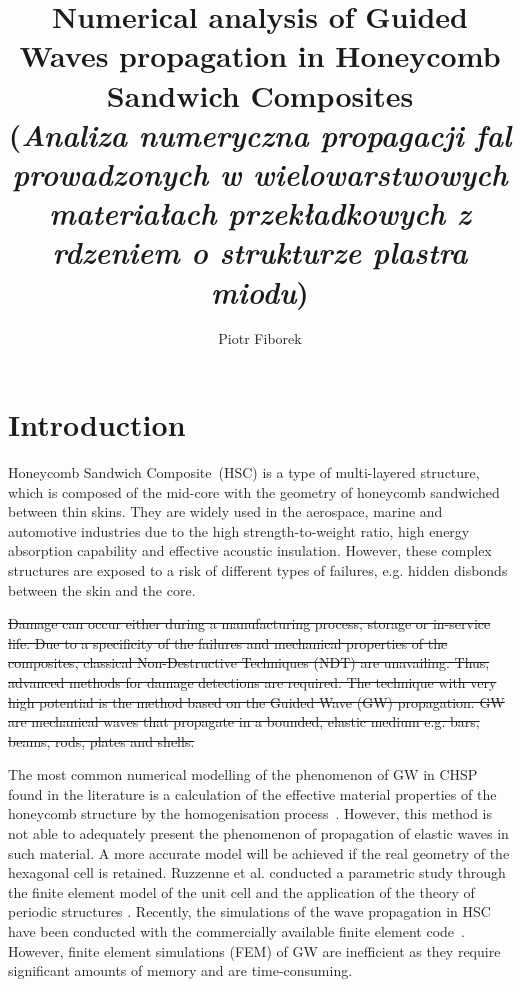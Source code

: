 \documentclass[a4paper,12pt]{article}
\author{Piotr Fiborek}
\title{Numerical analysis of Guided Waves propagation in Honeycomb Sandwich Composites\\
(\textit{Analiza numeryczna propagacji fal prowadzonych w wielowarstwowych materia\l{}ach przek\l{}adkowych z rdzeniem o strukturze plastra miodu})}
\providecommand{\DIFdel}[1]{{\protect\color{red}\sout{#1}}}                      %
\providecommand{\DIFdelbegin}{} %
\providecommand{\DIFdelend}{} %
\newcommand{\DIFscaledelfig}{0.5}
\newlength{\DIFdelgraphicswidth} %
\newlength{\DIFdelgraphicsheight} %
\newcommand{\DIFdelincludegraphics}[2][]{%
\sbox{\DIFdelgraphicsbox}{\DIFOincludegraphics[#1]{#2}}%
\settoboxwidth{\DIFdelgraphicswidth}{\DIFdelgraphicsbox} %
\settoboxtotalheight{\DIFdelgraphicsheight}{\DIFdelgraphicsbox} %
\scalebox{\DIFscaledelfig}{%
\parbox[b]{\DIFdelgraphicswidth}{\usebox{\DIFdelgraphicsbox}\\[-\baselineskip] \rule{\DIFdelgraphicswidth}{0em}}\llap{\resizebox{\DIFdelgraphicswidth}{\DIFdelgraphicsheight}{%
\setlength{\unitlength}{\DIFdelgraphicswidth}%
\begin{picture}(1,1)%
\thicklines\linethickness{2pt} %
{\color[rgb]{1,0,0}\put(0,0){\framebox(1,1){}}}%
{\color[rgb]{1,0,0}\put(0,0){\line( 1,1){1}}}%
{\color[rgb]{1,0,0}\put(0,1){\line(1,-1){1}}}%
\end{picture}%
}\hspace*{3pt}}} %
} %
\DeclareRobustCommand{\DIFdelbegin}{\DIFOdelbegin \let\includegraphics\DIFdelincludegraphics} %
\DeclareRobustCommand{\DIFdelend}{\DIFOaddend \let\includegraphics\DIFOincludegraphics} %
\begin{document}
\maketitle
\thispagestyle{empty}
\section{Introduction}
\label{sec:intro}
Honeycomb Sandwich Composite~(HSC) is a type of multi-layered structure, which 
is composed of the mid-core with the geometry of honeycomb sandwiched between 
thin skins.
They are widely used in the aerospace, marine and automotive industries due to 
the high strength-to-weight ratio, high energy absorption capability and 
effective acoustic insulation. However, these complex structures are exposed to 
a risk of different types of failures, e.g. hidden disbonds between the skin 
and the core.



\DIFdelbegin \DIFdel{Damage can occur either during a manufacturing process, storage or in-service 
life.
Due to a specificity of the failures and mechanical properties of the 
composites, classical Non-Destructive Techniques (NDT) are unavailing.
Thus, advanced methods for damage detections are required. The technique with 
very high potential is the method based on the Guided Wave (GW) propagation.
GW are mechanical waves that propagate in a bounded, elastic medium e.g. bars, 
beams, rods, plates and shells.
}%

\DIFdelend The most common numerical modelling of the phenomenon of GW in CHSP found in 
the literature is a calculation of the effective material properties of the 
honeycomb structure by the homogenisation process~\cite{qi2008ultrasonic, 
mustapha2011assessment, baid2015dispersion, sikdar2016guided}.
However, this method is not able to adequately present the phenomenon of 
propagation of elastic waves in such material.
A more accurate model will be achieved if the real geometry of the hexagonal 
cell is retained.
Ruzzenne et al. conducted a parametric study through the finite element model 
of the unit cell and the application of the theory of periodic structures 
\cite{ruzzene2003wave}.
Recently, the simulations of the wave propagation in HSC have been conducted 
with the commercially available finite element code~\cite{song2009guided, 
hosseini2013numerical, tian2015wavenumber, zhao2018wave}.
However, finite element simulations (FEM) of GW are inefficient as they require 
significant amounts of memory and are time-consuming.
\end{document}
